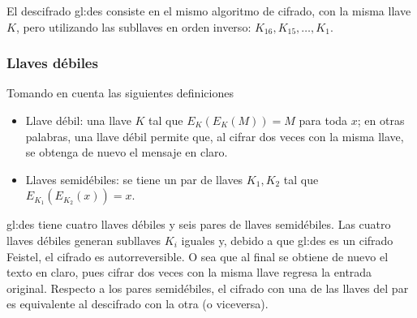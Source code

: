 El descifrado \gls{gl:des} consiste en el mismo algoritmo de cifrado,
con la misma llave $K$, pero utilizando las subllaves en orden inverso:
$K_{16}, K_{15}, \dots, K_1$.

\subsubsection{Llaves débiles}
Tomando en cuenta las siguientes definiciones

\begin{itemize}
  \item Llave débil: una llave $K$ tal que $E_K(E_K(M)) = M$ para toda
    $x$; en otras palabras, una llave débil permite que, al cifrar dos
    veces con la misma llave, se obtenga de nuevo el mensaje en claro.
  \item Llaves semidébiles: se tiene un par de llaves $K_1, K_2$ tal que
    $E_{K_1}(E_{K_2}(x)) = x$.
\end{itemize}

\gls{gl:des} tiene cuatro llaves débiles y seis pares de llaves
semidébiles. Las cuatro llaves débiles generan subllaves $K_i$ iguales y,
debido a que \gls{gl:des} es un cifrado Feistel, el cifrado es
autorreversible. O sea que al final se obtiene de nuevo el texto en claro,
pues cifrar dos veces con la misma llave regresa la entrada original.
Respecto a los pares semidébiles, el cifrado con una de las llaves del
par es equivalente al descifrado  con la otra (o viceversa).
